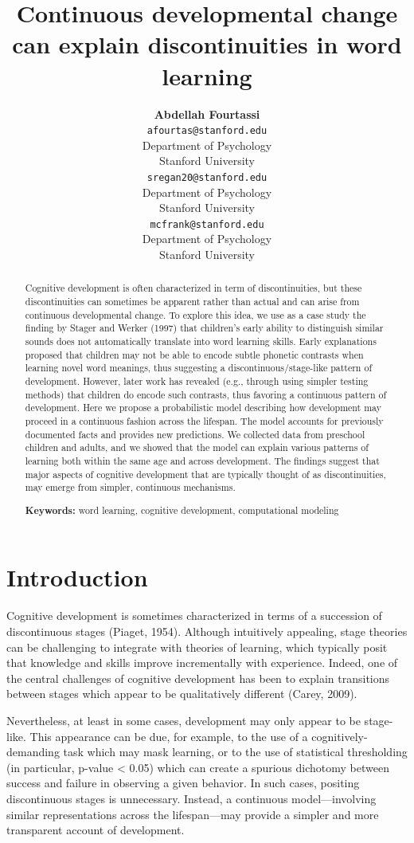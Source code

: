\documentclass[10pt, letterpaper]{article}
\title{Continuous developmental change can explain discontinuities in word
learning}
\author{{\large \bf Abdellah Fourtassi} \\ \texttt{afourtas@stanford.edu} \\ Department of Psychology \\ Stanford University \And {\large \bf Sophie Regan} \\ \texttt{sregan20@stanford.edu} \\ Department of Psychology \\ Stanford University \And {\large \bf Michael C. Frank} \\ \texttt{mcfrank@stanford.edu} \\ Department of Psychology \\ Stanford University}
\begin{document}
\maketitle

\begin{abstract}
Cognitive development is often characterized in term of discontinuities,
but these discontinuities can sometimes be apparent rather than actual
and can arise from continuous developmental change. To explore this
idea, we use as a case study the finding by Stager and Werker (1997)
that children's early ability to distinguish similar sounds does not
automatically translate into word learning skills. Early explanations
proposed that children may not be able to encode subtle phonetic
contrasts when learning novel word meanings, thus suggesting a
discontinuous/stage-like pattern of development. However, later work has
revealed (e.g., through using simpler testing methods) that children do
encode such contrasts, thus favoring a continuous pattern of
development. Here we propose a probabilistic model describing how
development may proceed in a continuous fashion across the lifespan. The
model accounts for previously documented facts and provides new
predictions. We collected data from preschool children and adults, and
we showed that the model can explain various patterns of learning both
within the same age and across development. The findings suggest that
major aspects of cognitive development that are typically thought of as
discontinuities, may emerge from simpler, continuous mechanisms.

\textbf{Keywords:}
word learning, cognitive development, computational modeling
\end{abstract}

\section{Introduction}\label{introduction}

Cognitive development is sometimes characterized in terms of a
succession of discontinuous stages (Piaget, 1954). Although intuitively
appealing, stage theories can be challenging to integrate with theories
of learning, which typically posit that knowledge and skills improve
incrementally with experience. Indeed, one of the central challenges of
cognitive development has been to explain transitions between stages
which appear to be qualitatively different (Carey, 2009).

Nevertheless, at least in some cases, development may only appear to be
stage-like. This appearance can be due, for example, to the use of a
cognitively-demanding task which may mask learning, or to the use of
statistical thresholding (in particular, p-value \textless{} 0.05) which
can create a spurious dichotomy between success and failure in observing
a given behavior. In such cases, positing discontinuous stages is
unnecessary. Instead, a continuous model---involving similar
representations across the lifespan---may provide a simpler and more
transparent account of development.
\end{document}
